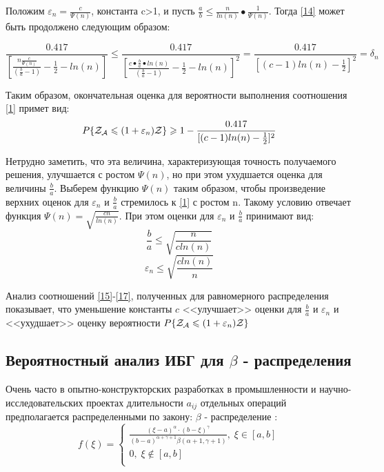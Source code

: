 \documentclass[a4paper, 14pt]{extarticle}
\numberwithin{equation}{section}
\begin{document}
Положим $\varepsilon_n = \frac{c}{\Psi(n)}$, константа c>1, и пусть $\frac{a}{b} \leqslant \frac{n}{ln(n)} • \frac{1}{\Psi(n)}$. Тогда \eqref{14} может быть продолжено следующим образом:

\begin{equation*}
\frac{0.417}{[\frac{n\frac{c}{\Psi(n)}}{(\frac{b}{a}-1)}-\frac{1}{2}-ln(n)]} \leqslant \frac{0.417}{[\frac{c•\frac{b}{a}•ln(n)}{(\frac{b}{a}-1)}-\frac{1}{2}-ln(n)]^2} = \frac{0.417}{[(c-1)ln(n)-\frac{1}{2}]^2} = \delta_n
\end{equation*}

Таким образом, окончательная оценка для вероятности выполнения соотношения \eqref{1} примет вид:
\begin{equation}\label{15}
P \{ \text{$\mathcal{Z_{A}}$} \leqslant (1+\varepsilon_n)\mathcal{Z} \} \geqslant 1 - \frac{0.417}{[(c-1)ln(n)-\frac{1}{2}]^2}
\end{equation}

Нетрудно заметить, что эта величина, характеризующая точность получаемого решения, улучшается с ростом $\Psi(n)$, но при этом ухудшается оценка для величины $\frac{b}{a}$. Выберем функцию $\Psi(n)$ таким образом, чтобы произведение верхних оценок для $\varepsilon_n$ и $\frac{b}{a}$ стремилось к \eqref{1} с ростом n. Такому условию отвечает функция $\Psi(n) = \sqrt{\frac{cn}{ln(n)}}$. При этом оценки для $\varepsilon_n$ и $\frac{b}{a}$ принимают вид:
\begin{equation}\label{16}
\frac{b}{a} \leqslant \sqrt{\frac{n}{cln(n)}}
\end{equation}
\begin{equation}\label{17}
\varepsilon_n \leqslant \sqrt{\frac{cln(n)}{n}}
\end{equation}

Анализ соотношений \ref{15}-\ref{17}, полученных для равномерного распределения показывает, что уменьшение константы $c$ <<улучшает>> оценки для $\frac{b}{a}$ и $\varepsilon_n$ и <<ухудшает>> оценку вероятности $P \{ \text{$\mathcal{Z_{A}}$} \leqslant (1+\varepsilon_n)\mathcal{Z} \}$\\


\subsection{Вероятностный анализ ИБГ для $\beta$ - распределения}


 Очень часто в опытно-конструкторских разработках в промышленности и научно-исследовательских проектах длительности $a_{ij}$ отдельных операций предполагается распределенными по закону: $\beta$ - распределение :
\begin{equation*}
f(\xi) = 
\begin{cases}
   \frac{(\xi-a)^\alpha \cdot (b-\xi)^\gamma}{(b-a)^{\alpha+\gamma+1} \beta(\alpha+1, \gamma+1)},  \; \xi \in [a,b]\\
   0, \; \xi \notin [a,b] \\
 \end{cases}
\end{equation*}
\end{document}
